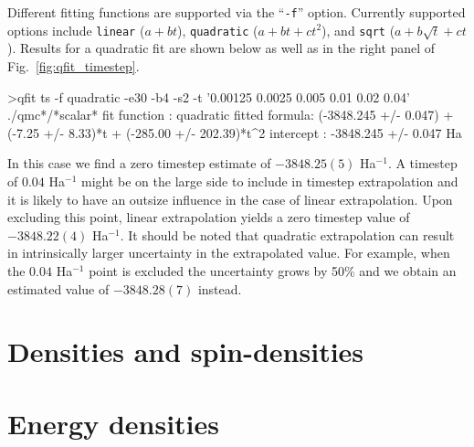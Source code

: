 Different fitting functions are supported via the ``\texttt{-f}'' option.
Currently supported options include \texttt{linear} ($a+bt$),
\texttt{quadratic} ($a+bt+ct^2$), and \texttt{sqrt} ($a+b\sqrt{t}+ct$).
Results for a quadratic fit are shown below as well as in the right
panel of Fig.~\ref{fig:qfit_timestep}.
\begin{shade}
>qfit ts -f quadratic -e30 -b4 -s2 -t '0.00125 0.0025 0.005 0.01 0.02 0.04' ./qmc*/*scalar*
fit function  : quadratic
fitted formula: (-3848.245 +/- 0.047) + (-7.25 +/- 8.33)*t + (-285.00 +/- 202.39)*t^2
intercept     : -3848.245 +/- 0.047  Ha
\end{shade}
In this case we find a zero timestep estimate of $-3848.25(5)$ Ha$^{-1}$.
A timestep of $0.04$ Ha$^{-1}$ might be on the large side to include in
timestep extrapolation and it is likely to have an outsize influence
in the case of linear extrapolation.  Upon excluding this point, linear
extrapolation yields a zero timestep value of $-3848.22(4)$ Ha$^{-1}$.
It should be noted that quadratic extrapolation can result in intrinsically
larger uncertainty in the extrapolated value.  For example, when the $0.04$
Ha$^{-1}$ point is excluded the uncertainty grows by 50\% and we obtain an
estimated value of $-3848.28(7)$ instead.



\section{Densities and spin-densities}
\label{sec:densities}

\section{Energy densities}
\label{sec:energydensities}


